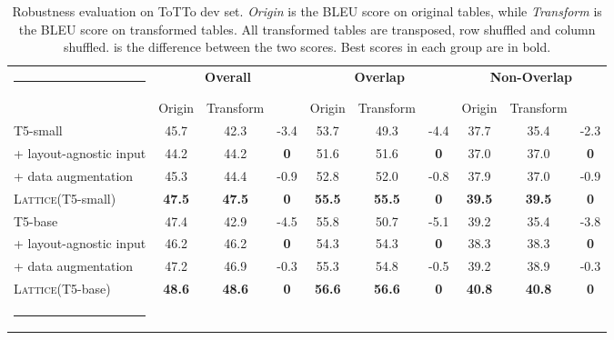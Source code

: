\documentclass[11pt]{article}
\makeatletter
\def\hlinewd#1{\noalign{\ifnum0=`}\fi\hrule \@height #1 \futurelet\reserved@a\@xhline}
\newcommand{\model}{\mbox{\textsc{Lattice}}\xspace}
\makeatother
\begin{document}
\begin{table*}[t] 
    \small
	\centering  \renewcommand{\arraystretch}{1.1}
	\setlength{\tabcolsep}{7pt}
	\begin{tabular}{lccccccccc}
\hlinewd{0.75pt}
		{\multirow{2}{*}{\textbf{Model}}}&\multicolumn{3}{c}{\textbf{Overall}}&\multicolumn{3}{c}{\textbf{Overlap}}&\multicolumn{3}{c}{\textbf{Non-Overlap}}\\
		\cmidrule(lr){2-4}
		\cmidrule(lr){5-7}
		\cmidrule(lr){8-10}
        &Origin&Transform&&Origin&Transform&&Origin&Transform&\\
		\hline
		T5-small & 45.7 & 42.3 & -3.4 & 53.7 & 49.3 & -4.4 & 37.7 & 35.4 & -2.3 \\
		+ layout-agnostic input & 44.2 & 44.2 & \textbf{0} & 51.6 & 51.6 & \textbf{0} & 37.0 & 37.0 & \textbf{0} \\
		+ data augmentation & 45.3 & 44.4 & -0.9 & 52.8 & 52.0 & -0.8 & 37.9 & 37.0 & -0.9 \\
		\model (T5-small) & \textbf{47.5} & \textbf{47.5} & \textbf{0} & \textbf{55.5} & \textbf{55.5} & \textbf{0} & \textbf{39.5} & \textbf{39.5} & \textbf{0} \\ \hline
        T5-base & 47.4 & 42.9 & -4.5 & 55.8 & 50.7 & -5.1 & 39.2  & 35.4 & -3.8 \\
        + layout-agnostic input  & 46.2 & 46.2 & \textbf{0} & 54.3 & 54.3 & \textbf{0} & 38.3 & 38.3 & \textbf{0} \\
		+ data augmentation & 47.2 & 46.9 & -0.3 & 55.3 & 54.8 & -0.5 & 39.2 & 38.9 & -0.3 \\
		\model (T5-base) & \textbf{48.6} & \textbf{48.6} & \textbf{0} & \textbf{56.6} & \textbf{56.6} & \textbf{0} & \textbf{40.8} & \textbf{40.8} & \textbf{0} \\ 
		\hlinewd{0.75pt}
	\end{tabular}
    \caption{Robustness evaluation on ToTTo dev set. \textit{Origin} is the BLEU score on original tables, while \textit{Transform} is the BLEU score on transformed tables. All transformed tables are transposed, row shuffled and column shuffled.  is the difference between the two scores. Best scores in each group are in bold.}
	\label{tb/robust}
\end{table*}
\end{document}
